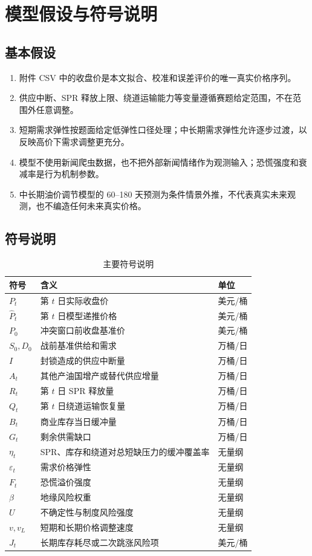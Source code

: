 \section{模型假设与符号说明}

\subsection{基本假设}

\begin{enumerate}
  \item 附件 CSV 中的收盘价是本文拟合、校准和误差评价的唯一真实价格序列。
  \item 供应中断、SPR 释放上限、绕道运输能力等变量遵循赛题给定范围，不在范围外任意调整。
  \item 短期需求弹性按题面给定低弹性口径处理；中长期需求弹性允许逐步过渡，以反映高价下需求调整更充分。
  \item 模型不使用新闻爬虫数据，也不把外部新闻情绪作为观测输入；恐慌强度和衰减率是行为机制参数。
  \item 中长期油价调节模型的 60--180 天预测为条件情景外推，不代表真实未来观测，也不编造任何未来真实价格。
\end{enumerate}

\subsection{符号说明}

\begin{table}[!htbp]
\centering
\caption{主要符号说明}
\begin{tabularx}{\linewidth}{lXl}
\toprule
符号 & 含义 & 单位 \\
\midrule
$P_t$ & 第 $t$ 日实际收盘价 & 美元/桶 \\
$\hat P_t$ & 第 $t$ 日模型递推价格 & 美元/桶 \\
$P_0$ & 冲突窗口前收盘基准价 & 美元/桶 \\
$S_0,D_0$ & 战前基准供给和需求 & 万桶/日 \\
$I$ & 封锁造成的供应中断量 & 万桶/日 \\
$A_t$ & 其他产油国增产或替代供应增量 & 万桶/日 \\
$R_t$ & 第 $t$ 日 SPR 释放量 & 万桶/日 \\
$Q_t$ & 第 $t$ 日绕道运输恢复量 & 万桶/日 \\
$B_t$ & 商业库存当日缓冲量 & 万桶/日 \\
$G_t$ & 剩余供需缺口 & 万桶/日 \\
$\eta_t$ & SPR、库存和绕道对总短缺压力的缓冲覆盖率 & 无量纲 \\
$\varepsilon_t$ & 需求价格弹性 & 无量纲 \\
$F_t$ & 恐慌溢价强度 & 无量纲 \\
$\beta$ & 地缘风险权重 & 无量纲 \\
$U$ & 不确定性与制度风险强度 & 无量纲 \\
$v,v_L$ & 短期和长期价格调整速度 & 无量纲 \\
$J_t$ & 长期库存耗尽或二次跳涨风险项 & 美元/桶 \\
\bottomrule
\end{tabularx}
\end{table}

